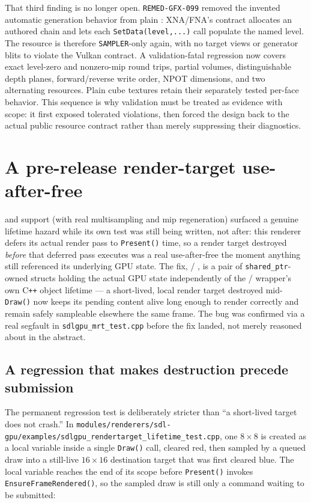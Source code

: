 That third finding is no longer open. \texttt{REMED-GFX-099} removed the invented automatic
generation behavior from plain : XNA/FNA's contract allocates an authored
chain and lets each \texttt{SetData(level,...)} call populate the named level. The resource is
therefore \texttt{SAMPLER}-only again, with no target views or generator blits to violate the
Vulkan contract. A validation-fatal regression now covers exact level-zero and nonzero-mip
round trips, partial volumes, distinguishable depth planes, forward/reverse write order, NPOT
dimensions, and two alternating resources. Plain cube textures retain their separately tested
per-face behavior. This sequence is why validation must be treated as evidence with scope: it
first exposed tolerated violations, then forced the design back to the actual public resource
contract rather than merely suppressing their diagnostics.

\section{A pre-release render-target use-after-free}

 and  support (with real multisampling and
mip regeneration) surfaced a genuine lifetime hazard while its own test was still being written,
not after: this renderer defers its actual render pass to \texttt{Present()} time, so a render
target destroyed \emph{before} that deferred pass executes was a real use-after-free the moment
anything still referenced its underlying GPU state. The fix,
 / , is a pair of
\texttt{shared\_ptr}-owned structs holding the actual GPU state independently of the
 /  wrapper's own
C\texttt{++} object lifetime --- a short-lived, local render target destroyed mid-\texttt{Draw()}
now keeps its pending content alive long enough to render correctly and remain safely sampleable
elsewhere the same frame. The bug was confirmed via a real segfault in
\texttt{sdlgpu\_mrt\_test.cpp} before the fix landed, not merely reasoned about in the abstract.

\subsection{A regression that makes destruction precede submission}

The permanent regression test is deliberately stricter than ``a short-lived target does not
crash.'' In \texttt{modules/renderers/sdl-gpu/examples/\allowbreak{}sdlgpu\_rendertarget\_lifetime\_test.cpp}, one \(8\times8\)
 is created as a local variable inside a single \texttt{Draw()} call,
cleared red, then sampled by a queued  draw into a still-live
\(16\times16\) destination target that was first cleared blue. The local variable reaches the
end of its scope before \texttt{Present()} invokes \texttt{EnsureFrameRendered()}, so the
sampled draw is still only a command waiting to be submitted:


